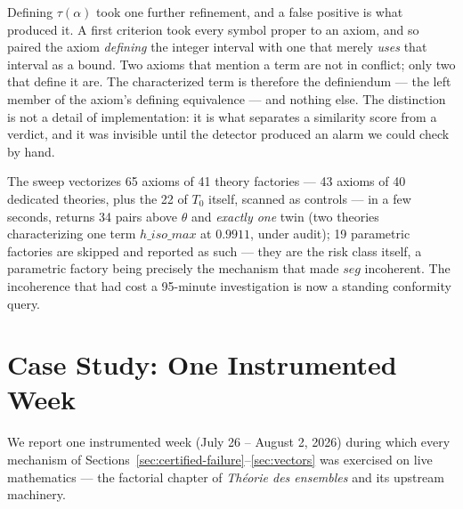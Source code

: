 \documentclass[11pt]{article}
\theoremstyle{remark}\newtheorem{example}{Example}
\begin{document}
Defining $\tau(\alpha)$ took one further refinement, and a false positive is what
produced it. A first criterion took every symbol proper to an axiom, and so paired the
axiom \emph{defining} the integer interval with one that merely \emph{uses} that
interval as a bound. Two axioms that mention a term are not in conflict; only two that
define it are. The characterized term is therefore the definiendum --- the left member
of the axiom's defining equivalence --- and nothing else. The distinction is not a
detail of implementation: it is what separates a similarity score from a verdict, and
it was invisible until the detector produced an alarm we could check by hand.

The sweep vectorizes 65 axioms of 41 theory factories --- 43 axioms of 40 dedicated
theories, plus the 22 of $T_0$ itself, scanned as controls --- in a few seconds,
returns 34 pairs above $\theta$ and \emph{exactly one} twin (two theories
characterizing one term $h\_iso\_max$ at $0.9911$, under audit); 19 parametric
factories are skipped and reported as such --- they are the risk class itself, a
parametric factory being precisely the mechanism that made $\mathit{seg}$ incoherent.
The incoherence that had cost a 95-minute investigation is now a standing conformity
query.

\section{Case Study: One Instrumented Week}
\label{sec:case-study}
\label{sec:casestudy}

We report one instrumented week (July 26 -- August 2, 2026) during which every
mechanism of Sections~\ref{sec:certified-failure}--\ref{sec:vectors} was exercised on
live mathematics --- the factorial chapter of \emph{Th\'eorie des ensembles} and its
upstream machinery.
\end{document}
